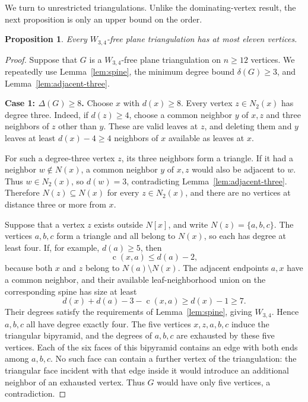 \documentclass[11pt,a4paper]{article}
\newtheorem{proposition}[theorem]{Proposition}
\theoremstyle{remark}
\newcommand{\cdeg}{\operatorname{c}}
\begin{document}
We turn to unrestricted triangulations. Unlike the dominating-vertex
result, the next proposition is only an upper bound on the order.

\begin{proposition}\label{prop:w34tri}
Every $W_{3,4}$-free plane triangulation has at most eleven vertices.
\end{proposition}

\begin{proof}
Suppose that $G$ is a $W_{3,4}$-free plane triangulation on $n\ge12$
vertices. We repeatedly use Lemma~\ref{lem:spine}, the minimum degree
bound $\delta(G)\ge3$, and Lemma~\ref{lem:adjacent-three}.

\medskip\noindent
\textbf{Case 1: $\Delta(G)\ge8$.}
Choose $x$ with $d(x)\ge8$. Every vertex $z\in N_2(x)$ has degree
three. Indeed, if $d(z)\ge4$, choose a common neighbor $y$ of $x,z$
and three neighbors of $z$ other than $y$. These are valid leaves at
$z$, and deleting them and $y$ leaves at least $d(x)-4\ge4$
neighbors of $x$ available as leaves at $x$.

For such a degree-three vertex $z$, its three neighbors form a
triangle. If it had a neighbor $w\notin N(x)$, a common neighbor
$y$ of $x,z$ would also be adjacent to $w$. Thus $w\in N_2(x)$,
so $d(w)=3$, contradicting Lemma~\ref{lem:adjacent-three}. Therefore
$N(z)\subseteq N(x)$ for every $z\in N_2(x)$, and there are no
vertices at distance three or more from $x$.

Suppose that a vertex $z$ exists outside $N[x]$, and write
$N(z)=\{a,b,c\}$. The vertices $a,b,c$ form a triangle and all
belong to $N(x)$, so each has degree at least four. If, for example,
$d(a)\ge5$, then
\[
\cdeg(x,a)\le d(a)-2,
\]
because both $x$ and $z$ belong to $N(a)\setminus N(x)$.
The adjacent endpoints $a,x$ have a common neighbor, and their
available leaf-neighborhood union on the corresponding spine has
size at least
\[
d(x)+d(a)-3-\cdeg(x,a)\ge d(x)-1\ge7.
\]
Their degrees satisfy the requirements of Lemma~\ref{lem:spine},
giving $W_{3,4}$. Hence $a,b,c$ all have degree exactly four.
The five vertices $x,z,a,b,c$ induce the triangular bipyramid,
and the degrees of $a,b,c$ are exhausted by these five vertices.
Each of the six faces of this bipyramid contains an edge with both
ends among $a,b,c$. No such face can contain a further vertex of
the triangulation: the triangular face incident with that edge
inside it would introduce an additional neighbor of an exhausted
vertex. Thus $G$ would have only five vertices, a contradiction.


\end{proof}
\end{document}
